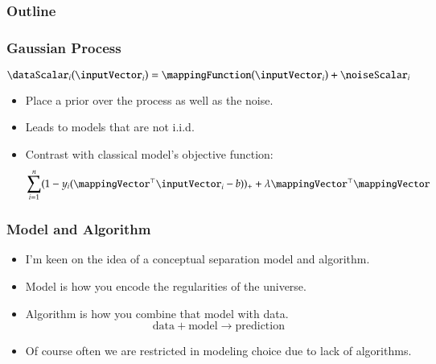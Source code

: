 \date[MLSS 2016]{MLSS, Arequipa, Peru\\
2nd August 2016}

\frame{\maketitle}
\begin{frame}
  \frametitle{Outline}

  \tableofcontents[hideallsubsections] 

\end{frame}


\begin{frame}
  \frametitle{Gaussian Process}
  \[
  \dataScalar_i(\inputVector_i) = \mappingFunction(\inputVector_i) + \noiseScalar_i
  \]
  \begin{itemize}
  \item Place a prior over the process as well as the noise.
  \item Leads to models that are not i.i.d.
    \item Contrast with classical model's objective function:
    \[
    \sum_{i=1}^n (1 - y_i(\mappingVector^\top\inputVector_i - b))_{+} + \lambda \mappingVector^\top\mappingVector
    \]
  \end{itemize}
\end{frame}
\begin{frame}
  \frametitle{Model and Algorithm}
  \begin{itemize}
  \item I'm keen on the idea of a conceptual separation model and algorithm.
  \item Model is how you encode the regularities of the universe.
  \item Algorithm is how you combine that model with data.
    \[
    \text{data} + \text{model} \rightarrow \text{prediction}
    \]
    \item Of course often we are restricted in modeling choice due to lack of algorithms.
  \end{itemize}
\end{frame}
    


